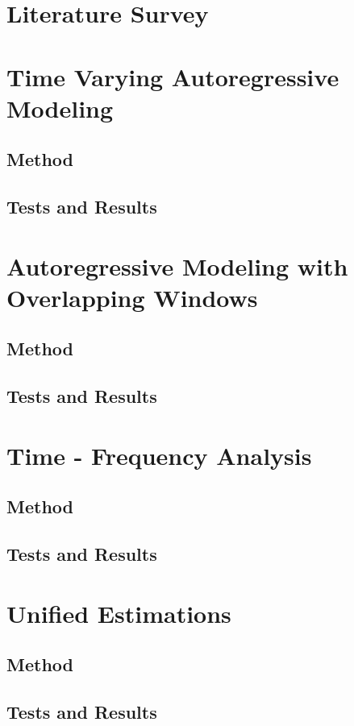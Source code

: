 \documentclass[a4paper,onesided,12pt]{report}
\begin{document}
\section{Literature Survey}

\section{Time Varying Autoregressive Modeling}
\subsection{Method}
\subsection{Tests and Results}

\section{Autoregressive Modeling with Overlapping Windows}
\subsection{Method}
\subsection{Tests and Results}

\section{Time - Frequency Analysis}
\subsection{Method}
\subsection{Tests and Results}

\section{Unified Estimations}
\subsection{Method}
\subsection{Tests and Results}
\end{document}
